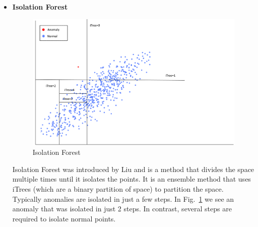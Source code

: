 \documentclass[a4paper,12pt]{report}
\theoremstyle{definitionNODot}
\begin{document}
\begin{itemize}
\begin{enumerate}
			$$LRD_k(s_i) = \Biggl ( \quad \frac{\sum\limits_{s\in N_k(s_i)}^{} RD_k(s_i,s)}{| N_k(s_i) |} \quad \Biggl )^{-1}$$
			
			\item \textbf{finally we can calculate the LOF.}  
			$$LOF(s_i)=\frac{\mathlarger{\sum}\limits_{s\in N_k(s_i)}^{} \frac{LRD_k(s)}{LRD_k(s_i)}}{| N_k(s_i) |}$$
		\end{enumerate}
		
		LOF is used as an anomaly score. So by setting a threshold we can decide whether a point is an anomaly or not.
		
		The difficulties we face with this algorithm are several. First we need to find the appropriate $k$ and the appropriate distance function $d$. Although the Euclidean distance works quite well many times it does not give us reliable results. Furthermore the algorithm refers to "locality". Another difficulty is that the time in the time series gives important information which is not exploited by the algorithm. Finally, it is computationally expensive because its complexity is $O(n^2)$.
		
		\item \textbf{Isolation Forest}
		
		\begin{figure}[h]
			\centering
			\includegraphics[width=\textwidth]{iTrees.png}
			\caption{Isolation Forest}
			\label{fig:iTrees}
		\end{figure}
		
		Isolation Forest was introduced by Liu \cite{TonyMingZhiHua2008IsolationForest} and is a method that divides the space multiple times until it isolates the points. It is an ensemble method that uses iTrees (which are a binary partition of space) to partition the space. Typically anomalies are isolated in just a few steps. In Fig.~\ref{fig:iTrees} we see an anomaly that was isolated in just 2 steps. In contrast, several steps are required to isolate normal points.
		

\end{itemize}
\end{document}
